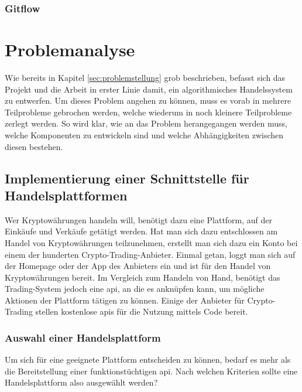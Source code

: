 \documentclass[oneside]{ausarbeitung}
\begin{document}
\subsection{Gitflow}
\label{sub:gitflow}

\chapter{Problemanalyse}
\label{cha:problemanalyse}

Wie bereits in Kapitel \ref{sec:problemstellung} grob beschrieben, befasst sich das Projekt und die Arbeit in erster Linie damit, ein algorithmisches Handelssystem zu entwerfen. Um dieses Problem angehen zu können, muss es vorab in mehrere Teilprobleme gebrochen werden, welche wiederum in noch kleinere Teilprobleme zerlegt werden. So wird klar, wie an das Problem herangegangen werden muss, welche Komponenten zu entwickeln sind und welche Abhängigkeiten zwischen diesen bestehen. 


\section{Implementierung einer Schnittstelle für Handelsplattformen}
\label{sec:schnittstelle_handelsplatform}

Wer Kryptowährungen handeln will, benötigt dazu eine Plattform, auf der Einkäufe und Verkäufe getätigt werden. Hat man sich dazu entschlossen am Handel von Kryptowährungen teilzunehmen, erstellt man sich dazu ein Konto bei einem der hunderten Crypto-Trading-Anbieter. Einmal getan, loggt man sich auf der Homepage oder der App des Anbieters ein und ist für den Handel von Kryptowährungen bereit. Im Vergleich zum Handeln von Hand, benötigt das Trading-System jedoch eine \ac{api}, an die es anknüpfen kann, um mögliche Aktionen der Plattform tätigen zu können. Einige der Anbieter für Crypto-Trading stellen kostenlose \ac{api}s für die Nutzung mittels Code bereit.

\subsection{Auswahl einer Handelsplattform}
\label{sub:auswahl_plattform}

Um sich für eine geeignete Plattform entscheiden zu können, bedarf es mehr als die Bereitstellung einer funktionstüchtigen \ac{api}. Nach welchen Kriterien sollte eine Handelsplattform also ausgewählt werden? \\
\end{document}
